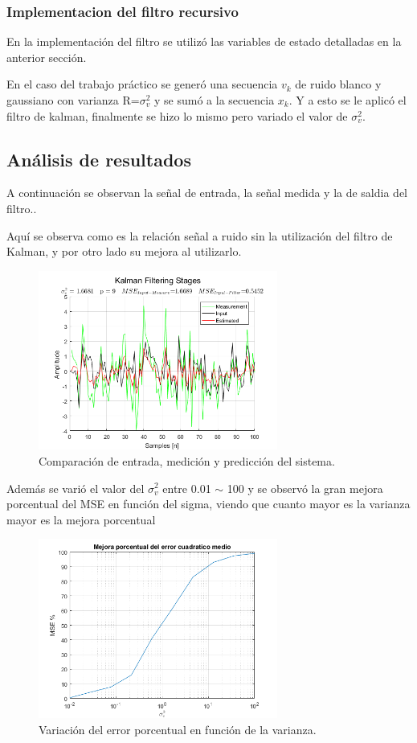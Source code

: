 \subsubsection{Implementacion del filtro recursivo}
En la implementación del filtro se utilizó las variables de estado detalladas en la anterior sección.

En el caso del trabajo práctico se generó una secuencia  $v_k$ de ruido blanco y gaussiano con varianza R=$\sigma_v^2$ y se sumó a la secuencia $x_k$. Y a esto se le aplicó el filtro de kalman, finalmente se hizo lo mismo pero variado el valor de $\sigma_v^2$.


\subsection{Análisis de resultados}
A continuación se observan la señal de entrada, la señal medida y la de saldia del filtro..

Aquí se observa como es la relación señal a ruido sin la utilización del filtro de Kalman, y por otro lado su mejora al utilizarlo.

\begin{figure}[H]
\centering
	\includegraphics[width=0.7\textwidth, trim = {0 0 0 0},clip]{./Imagenes/Kalman_Filter.png}
	\caption{Comparación de entrada, medición y predicción del sistema.}
	\label{fig:kalmanfilter}
\end{figure}


Además se varió el valor del $\sigma_v^2$ entre 0.01 $\sim$ 100 y se observó la gran mejora porcentual del MSE en función del sigma, viendo que cuanto mayor es la varianza mayor es la mejora porcentual 
\begin{figure}[H]
\centering
	\includegraphics[width=0.7\textwidth, trim = {0 0 0 0},clip]{./Imagenes/Error_porcentual.png}
	\caption{Variación del error porcentual en función de la varianza.}
	\label{fig:errorporcent}
\end{figure}
